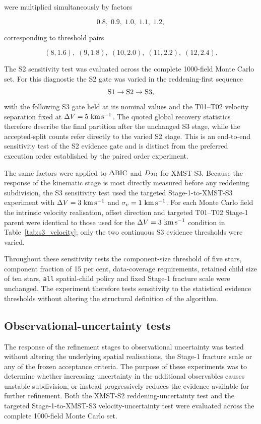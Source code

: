 \documentclass[fleqn,usenatbib]{rasti}
\begin{document}
were multiplied simultaneously by factors

\[
0.8,\;0.9,\;1.0,\;1.1,\;1.2,
\]

corresponding to threshold pairs

\[
(8,1.6),\;
(9,1.8),\;
(10,2.0),\;
(11,2.2),\;
(12,2.4).
\]

The S2 sensitivity test was evaluated across the complete 1000-field Monte
Carlo set. For this diagnostic the S2 gate was varied in the
reddening-first sequence
\[
{\rm S1}\rightarrow {\rm S2}\rightarrow {\rm S3},
\]
with the following S3 gate held at its nominal values and the T01--T02
velocity separation fixed at $\Delta V=5~{\rm km\,s^{-1}}$. The quoted
global recovery statistics therefore describe the final partition after
the unchanged S3 stage, while the accepted-split counts refer directly to
the varied S2 stage. This is an end-to-end sensitivity test of the S2
evidence gate and is distinct from the preferred execution order established
by the paired order experiment.

The same factors were applied to $\Delta{\rm BIC}$ and $D_{\rm 2D}$ for
XMST-S3. Because the response of the kinematic stage is most directly
measured before any reddening subdivision, the S3 sensitivity test used the
targeted Stage-1-to-XMST-S3 experiment with
$\Delta V=3~{\rm km\,s^{-1}}$ and
$\sigma_v=1~{\rm km\,s^{-1}}$. For each Monte Carlo field the intrinsic
velocity realisation, offset direction and targeted T01--T02 Stage-1 parent
were identical to those used for the $\Delta V=3~{\rm km\,s^{-1}}$
condition in Table~\ref{tab:s3_velocity}; only the two continuous S3 evidence
thresholds were varied.

Throughout these sensitivity tests the component-size threshold of five
stars, component fraction of 15 per cent, data-coverage requirements,
retained child size of ten stars, \texttt{all} spatial-child policy and
fixed Stage-1 fracture scale were unchanged. The experiment therefore tests
sensitivity to the statistical evidence thresholds without altering the
structural definition of the algorithm.


\subsection{Observational-uncertainty tests}

The response of the refinement stages to observational uncertainty was
tested without altering the underlying spatial realisations, the Stage-1
fracture scale or any of the frozen acceptance criteria. The purpose of
these experiments was to determine whether increasing uncertainty in the
additional observables causes unstable subdivision, or instead progressively
reduces the evidence available for further refinement. Both the XMST-S2
reddening-uncertainty test and the targeted Stage-1-to-XMST-S3
velocity-uncertainty test were evaluated across the complete 1000-field
Monte Carlo set.
\end{document}
